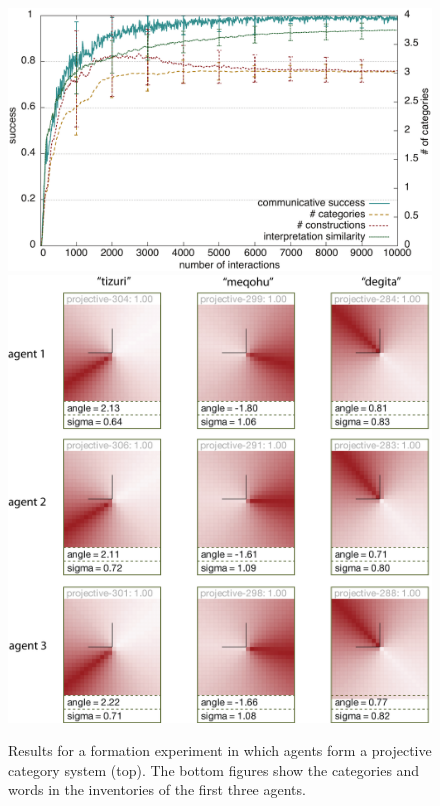 \begin{figure}
\begin{center}
\includegraphics[width=0.9\columnwidth]{figs/category-formation-projective-results+categories-1}
\includegraphics[width=0.75\columnwidth]{figs/category-formation-projective-results+categories-2.png}
\end{center}
\caption[Results formation of projective category systems]{
Results for a formation experiment in which agents form
a projective category system (top). The bottom figures show the categories and words
in the inventories of the first three agents.}
\label{f:category-formation-projective-results}
\end{figure}

